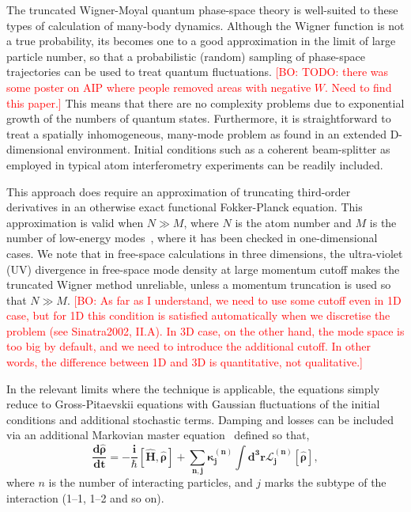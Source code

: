 \documentclass[aps,prl,twocolumn,showpacs,amsmath,amssymb,superscriptaddress]{revtex4-1}
\newcommand{\bogdansremark}[1]{\textcolor{red}{{[}BO: #1{]}}}
\begin{document}
The truncated Wigner-Moyal quantum phase-space theory is well-suited
to these types of calculation of many-body dynamics.
Although the Wigner function is not a true probability,
its becomes one to a good approximation in the limit of large particle number,
so that a probabilistic (random) sampling of phase-space trajectories
can be used to treat quantum fluctuations.
	\bogdansremark{TODO: there was some poster on AIP where people removed areas with negative $W$.
	Need to find this paper.}
This means that there are no complexity problems due to exponential growth
of the numbers of quantum states.
Furthermore, it is straightforward to treat a spatially inhomogeneous,
many-mode problem as found in an extended D-dimensional environment.
Initial conditions such as a coherent beam-splitter
as employed in typical atom interferometry experiments can be readily included.

This approach does require an approximation of truncating third-order derivatives
in an otherwise exact functional Fokker-Planck equation.
This approximation is valid when $N \gg M$, where $N$ is the atom number and
$M$ is the number of low-energy modes~\cite{Drummond1993,Sinatra2002,Norrie2006},
where it has been checked in one-dimensional cases.
We note that in free-space calculations in three dimensions,
the ultra-violet (UV) divergence in free-space mode density at large momentum cutoff
makes the truncated Wigner method unreliable,
unless a momentum truncation is used so that $N \gg M$.
	\bogdansremark{As far as I understand, we need to use some cutoff even in 1D case,
	but for 1D this condition is satisfied automatically when we discretise the problem
	(see Sinatra2002, II.A).
	In 3D case, on the other hand, the mode space is too big by default,
	and we need to introduce the additional cutoff.
	In other words, the difference between 1D and 3D is quantitative, not qualitative.}

In the relevant limits where the technique is applicable,
the equations simply reduce to Gross-Pitaevskii equations with Gaussian fluctuations
of the initial conditions and additional stochastic terms.
Damping and losses can be included via an additional Markovian master equation~\cite{Jack2002}
defined so that,
\begin{equation}
\bm{
	\frac{d\hat{\rho}}{dt} = -\frac{i}{\hbar} \left[ \hat{H}, \hat{\rho} \right] +
	\sum_{n,\mathbf{j}} \kappa_{\mathbf{j}}^{(n)}
	\int d^{3}\mathbf{r}\mathcal{L}_{\mathbf{j}}^{(n)} \left[ \hat{\rho} \right],
}
\end{equation}
where $n$ is the number of interacting particles,
and $j$ marks the subtype of the interaction (1--1, 1--2 and so on).
\end{document}
